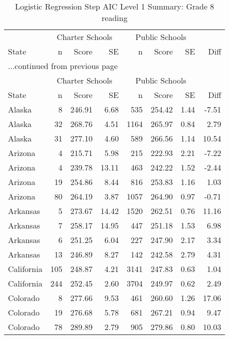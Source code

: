 \begin{longtable}{lrrr@{\extracolsep{10pt}}rrrr}
\caption{Logistic Regression Step AIC Level 1 Summary: Grade 8 reading} \\ 
  \hline
  & \multicolumn{3}{c}{Charter Schools} & \multicolumn{3}{c}{Public Schools} & \\ \cline{2-4} \cline{5-7} State & n & Score & SE & n & Score & SE & Diff \\ \endfirsthead \multicolumn{8}{l}{{...continued from previous page}}\\ \hline & \multicolumn{3}{c}{Charter Schools} & \multicolumn{3}{c}{Public Schools} & \\ \cline{2-4} \cline{5-7} State & n & Score & SE & n & Score & SE & Diff \\ \hline \endhead \hline \endfoot \endlastfoot \hline
Alaska &   8 & 246.91 & 6.68 & 535 & 254.42 & 1.44 & -7.51 \\ 
  Alaska &  32 & 268.76 & 4.51 & 1164 & 265.97 & 0.84 & 2.79 \\ 
  Alaska &  31 & 277.10 & 4.60 & 589 & 266.56 & 1.14 & 10.54 \\ 
  Arizona &   4 & 215.71 & 5.98 & 215 & 222.93 & 2.21 & -7.22 \\ 
  Arizona &   4 & 239.78 & 13.11 & 463 & 242.22 & 1.52 & -2.44 \\ 
  Arizona &  19 & 254.86 & 8.44 & 816 & 253.83 & 1.16 & 1.03 \\ 
  Arizona &  80 & 264.19 & 3.87 & 1057 & 264.90 & 0.97 & -0.71 \\ 
  Arkansas &   5 & 273.67 & 14.42 & 1520 & 262.51 & 0.76 & 11.16 \\ 
  Arkansas &   7 & 258.17 & 14.95 & 447 & 251.18 & 1.53 & 6.98 \\ 
  Arkansas &   6 & 251.25 & 6.04 & 227 & 247.90 & 2.17 & 3.34 \\ 
  Arkansas &  13 & 246.89 & 8.27 & 142 & 242.58 & 2.79 & 4.31 \\ 
  California & 105 & 248.87 & 4.21 & 3141 & 247.83 & 0.63 & 1.04 \\ 
  California & 244 & 252.45 & 2.60 & 3704 & 249.97 & 0.62 & 2.49 \\ 
  Colorado &   8 & 277.66 & 9.53 & 461 & 260.60 & 1.26 & 17.06 \\ 
  Colorado &  19 & 276.68 & 5.78 & 681 & 267.21 & 0.94 & 9.47 \\ 
  Colorado &  78 & 289.89 & 2.79 & 905 & 279.86 & 0.80 & 10.03 \\ 

\end{longtable}
